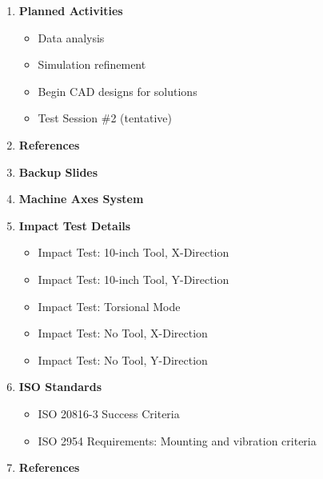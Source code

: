 \documentclass[9pt]{article}
\theoremstyle{definition} %
\theoremstyle{plain} %
\begin{document}
\begin{enumerate}
    \item \textbf{Planned Activities}
    \begin{itemize}
        \item Data analysis
        \item Simulation refinement
        \item Begin CAD designs for solutions
        \item Test Session \#2 (tentative)
    \end{itemize}

    \item \textbf{References}

    \item \textbf{Backup Slides}

    \item \textbf{Machine Axes System}

    \item \textbf{Impact Test Details}
    \begin{itemize}
        \item Impact Test: 10-inch Tool, X-Direction
        \item Impact Test: 10-inch Tool, Y-Direction
        \item Impact Test: Torsional Mode
        \item Impact Test: No Tool, X-Direction
        \item Impact Test: No Tool, Y-Direction
    \end{itemize}

    \item \textbf{ISO Standards}
    \begin{itemize}
        \item ISO 20816-3 Success Criteria
        \item ISO 2954 Requirements: Mounting and vibration criteria
    \end{itemize}

    \item \textbf{References}

\end{enumerate}
\end{document}
